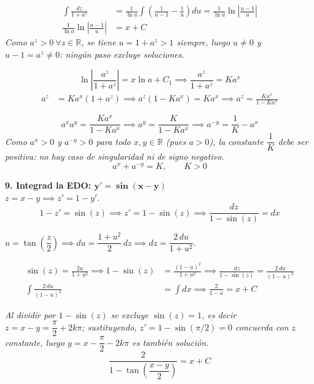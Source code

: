\documentclass[11pt, a4paper]{article}
\begin{document}
\begin{align*}
\int \frac{dz}{1+a^z} &= \frac{1}{\ln a}\int \left(\frac{1}{u-1}-\frac{1}{u}\right)du = \frac{1}{\ln a}\ln\left|\frac{u-1}{u}\right| \\
\frac{1}{\ln a}\ln\left|\frac{u-1}{u}\right| &= x+C
\end{align*}
\textit{Como $a^z>0\ \forall z\in\mathbb{R}$, se tiene $u=1+a^z>1$ siempre, luego $u\neq0$ y $u-1=a^z\neq0$: ningún paso excluye soluciones.}

\[
\ln\left|\frac{a^z}{1+a^z}\right| = x\ln a + C_1 \implies \frac{a^z}{1+a^z} = Ka^x
\]
\begin{align*}
a^z &= Ka^x(1+a^z) \implies a^z(1-Ka^x) = Ka^x \implies a^z = \frac{Ka^x}{1-Ka^x}
\end{align*}

\[
a^xa^y = \frac{Ka^x}{1-Ka^x} \implies a^y = \frac{K}{1-Ka^x} \implies a^{-y} = \frac{1}{K}-a^x
\]
\textit{Como $a^x>0$ y $a^{-y}>0$ para todo $x,y\in\mathbb{R}$ (pues $a>0$), la constante $\dfrac1K$ debe ser positiva: no hay caso de singularidad ni de signo negativo.}
\[
\boxed{a^x + a^{-y} = K, \qquad K>0}
\]


\noindent\textbf{9. Integrad la EDO: $\bm{y' = \sin(x-y)}$} \\
$z = x-y \implies z' = 1-y'$.
\[
1-z' = \sin(z) \implies z' = 1-\sin(z) \implies \frac{dz}{1-\sin(z)} = dx
\]

$u=\tan\left(\dfrac{z}{2}\right) \implies du = \dfrac{1+u^2}{2}\,dz \implies dz=\dfrac{2\,du}{1+u^2}$.\quad
{}

\begin{align*}
\sin(z) = \frac{2u}{1+u^2} \implies 1-\sin(z) &= \frac{(1-u)^2}{1+u^2} \implies \frac{dz}{1-\sin(z)} = \frac{2\,du}{(1-u)^2} \\
\int \frac{2\,du}{(1-u)^2} &= \int dx \implies \frac{2}{1-u} = x + C
\end{align*}

\textit{Al dividir por $1-\sin(z)$ se excluye $\sin(z)=1$, es decir $z=x-y=\dfrac{\pi}{2}+2k\pi$; sustituyendo, $z'=1-\sin(\pi/2)=0$ concuerda con $z$ constante, luego $y=x-\dfrac{\pi}{2}-2k\pi$ es también solución.}
\[
\boxed{\frac{2}{1-\tan\left(\dfrac{x-y}{2}\right)} = x + C}
\]
\end{document}
